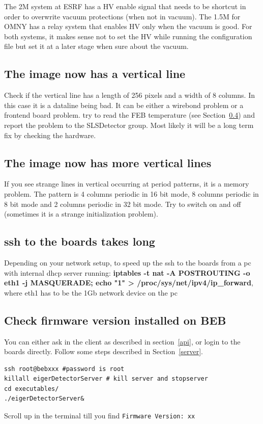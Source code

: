 \documentclass{article}
\begin{document}
The 2M system at ESRF has a HV enable signal that needs to be shortcut in order to overwrite vacuum protections (when not in vacuum). 
The 1.5M for OMNY has a relay system that enables HV only when the vacuum is good. 
For both systems, it makes sense not to set the HV while running the configuration file but set it at a later stage when sure about the vacuum. 

\subsection{The image now has a vertical line}
Check if the vertical line has a length of 256 pixels and a width of 8 columns. In this case it is a dataline being bad. It can be either a wirebond problem or a frontend board problem. try to read the FEB temperature (see Section~\ref{}) and report the problem to the SLSDetector group. Most likely it will be a long term fix by checking the hardware.

\subsection{The image now has more vertical lines}

If you see strange lines in vertical occurring at period patterns, it is a memory problem. The pattern is 4 columns periodic in 16 bit mode, 8 columns periodic in 8 bit mode and 2 columns periodic in 32 bit mode. Try to switch on and off (sometimes it is a strange initialization problem).

\subsection{ssh to the boards takes long}
Depending on your network setup,  to speed up the ssh to the boards from a pc with internal dhcp server running: \textbf{iptables -t nat -A POSTROUTING -o eth1 -j MASQUERADE; echo "1" > /proc/sys/net/ipv4/ip\_forward}, where eth1 has to be the 1Gb network device on the pc

\subsection{Check firmware version installed on BEB}
You can either ask in the client as described in section~\ref{api}, or login to the boards directly. Follow some steps described in Section~\ref{server}. 
\begin{verbatim}
ssh root@bebxxx #password is root
killall eigerDetectorServer # kill server and stopserver
cd executables/
./eigerDetectorServer&
\end{verbatim}
Scroll up in the terminal till you find {\tt{Firmware Version: xx}}
\end{document}

